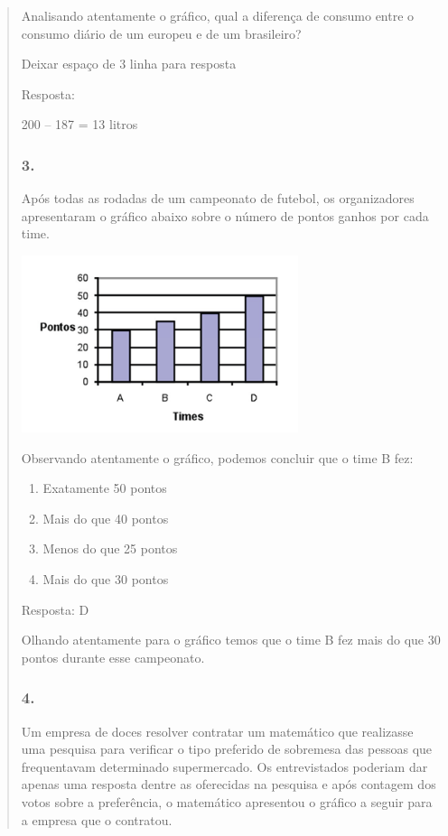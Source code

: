\begin{enumerate}
\begin{escolha}
\begin{enumerate}
\begin{itemize}
\begin{itemize}
\begin{escolha}
\begin{quote}
\begin{escolha}
{Analisando atentamente o gráfico, qual a diferença de consumo entre o
consumo diário de um europeu e de um brasileiro?

Deixar espaço de 3 linha para resposta

Resposta:

200 -- 187 = 13 litros

\subsubsection{3.}\label{section-93}

Após todas as rodadas de um campeonato de futebol, os organizadores
apresentaram o gráfico abaixo sobre o número de pontos ganhos por cada
time.

\includegraphics[width=3.19194in,height=2.04184in]{media/image96.png}

Observando atentamente o gráfico, podemos concluir que o time B fez:

\begin{enumerate}
\def\labelenumi{\alph{enumi})}
\item
  Exatamente 50 pontos
\item
  Mais do que 40 pontos
\item
  Menos do que 25 pontos
\item
  Mais do que 30 pontos
\end{enumerate}

Resposta: D

Olhando atentamente para o gráfico temos que o time B fez mais do que 30
pontos durante esse campeonato.

\subsubsection{4.}\label{section-94}

Um empresa de doces resolver contratar um matemático que realizasse uma
pesquisa para verificar o tipo preferido de sobremesa das pessoas que
frequentavam determinado supermercado. Os entrevistados poderiam dar
apenas uma resposta dentre as oferecidas na pesquisa e após contagem dos
votos sobre a preferência, o matemático apresentou o gráfico a seguir
para a empresa que o contratou.

}
\end{escolha}
\end{quote}
\end{escolha}
\end{itemize}
\end{itemize}
\end{enumerate}
\end{escolha}
\end{enumerate}
